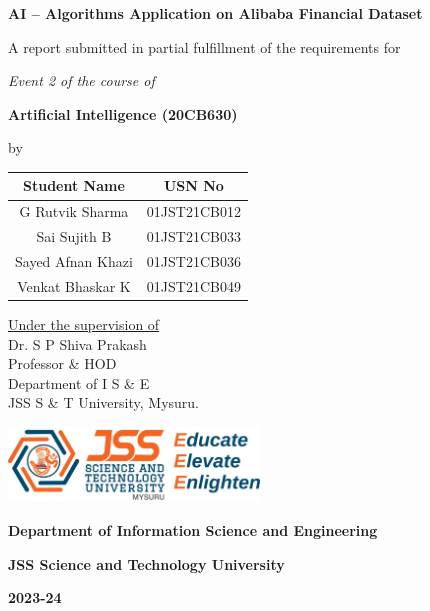 \documentclass[12pt,a4paper]{report}
\begin{document}
\begin{titlepage}
    \centering
    
    {\Huge \bfseries{AI – Algorithms Application on Alibaba Financial Dataset}\par}
    \vspace{1cm}
    {\large A report submitted in partial fulfillment of the requirements for\par}
    {\large\itshape Event 2 of the course of \par}
    \vspace{1cm}
    {\Large\bfseries Artificial Intelligence (20CB630)\par}  %
    \vspace{1cm}
    {\large by\par}
    \vspace{0.5cm}
    \begin{table}[htbp]
    \centering
    \begin{tabular}{|c|c|}
        \hline
        \textbf{Student Name} & \textbf{USN No} \\
        \hline
        G Rutvik Sharma & 01JST21CB012 \\
        \hline
        Sai Sujith B & 01JST21CB033 \\
        \hline
        Sayed Afnan Khazi & 01JST21CB036 \\
        \hline
        Venkat Bhaskar K & 01JST21CB049 \\
        \hline
    \end{tabular}
\end{table}
\vspace{2cm}

\noindent
\underline{Under the supervision of} \\
\vspace{0.5cm}
Dr. S P Shiva Prakash \\
Professor \& HOD \\
Department of I S \& E \\
JSS S \& T University, Mysuru.

    \vspace{2cm}
    \includegraphics[width=0.5\textwidth]{jssstulogo.jpg}\\
    \vspace{1cm}
    {\Large\bfseries Department of Information Science and Engineering\par}
    {\Large\bfseries JSS Science and Technology University \par}
    {\Large\bfseries 2023-24\par}
\end{titlepage}
\end{document}
